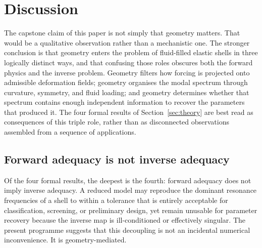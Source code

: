 
\section{Discussion}
\label{sec:discussion}

The capstone claim of this paper is not simply that geometry matters.  That
would be a qualitative observation rather than a mechanistic one.  The stronger conclusion is
that geometry enters the problem of fluid-filled elastic shells in three
logically distinct ways, and that confusing those roles obscures both the
forward physics and the inverse problem.  Geometry filters how forcing is
projected onto admissible deformation fields; geometry organises the modal
spectrum through curvature, symmetry, and fluid loading; and geometry
determines whether that spectrum contains enough independent information to
recover the parameters that produced it.  The four formal results of
Section~\ref{sec:theory} are best read as consequences of this triple role,
rather than as disconnected observations assembled from a sequence of
applications.

\subsection{Forward adequacy is not inverse adequacy}

Of the four formal results, the deepest is the fourth: forward adequacy does not
imply inverse adequacy.  A reduced model may reproduce the dominant resonance
frequencies of a shell to within a tolerance that is entirely acceptable for
classification, screening, or preliminary design, yet remain unusable for
parameter recovery because the inverse map is ill-conditioned or effectively
singular.  The present programme suggests that this decoupling is not an
incidental numerical inconvenience.  It is geometry-mediated.

